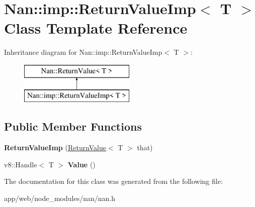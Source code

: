 \hypertarget{class_nan_1_1imp_1_1_return_value_imp}{}\section{Nan\+:\+:imp\+:\+:Return\+Value\+Imp$<$ T $>$ Class Template Reference}
\label{class_nan_1_1imp_1_1_return_value_imp}
Inheritance diagram for Nan\+:\+:imp\+:\+:Return\+Value\+Imp$<$ T $>$\+:\begin{figure}[H]
\begin{center}
\leavevmode
\includegraphics[height=2.000000cm]{class_nan_1_1imp_1_1_return_value_imp}
\end{center}
\end{figure}
\subsection*{Public Member Functions}
\begin{DoxyCompactItemize}
\item 
\mbox{\label{class_nan_1_1imp_1_1_return_value_imp_a780d34dec0f8a767e5d64a6e00894c25}} 
{\bfseries Return\+Value\+Imp} (\hyperlink{class_nan_1_1_return_value}{Return\+Value}$<$ T $>$ that)
\item 
\mbox{\label{class_nan_1_1imp_1_1_return_value_imp_a59cecbf4cd33d5340e08a016bd989a1c}} 
v8\+::\+Handle$<$ T $>$ {\bfseries Value} ()
\end{DoxyCompactItemize}


The documentation for this class was generated from the following file\+:\begin{DoxyCompactItemize}
\item 
app/web/node\+\_\+modules/nan/nan.\+h\end{DoxyCompactItemize}
